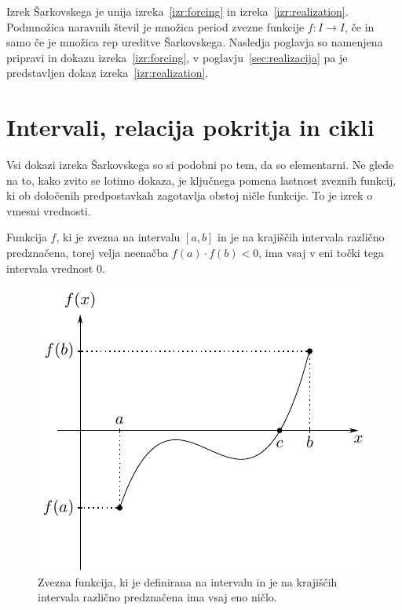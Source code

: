 \documentclass[mat2]{fmfdelo}
\begin{document}
Izrek Šarkovskega je unija izreka~\ref{izr:forcing} in izreka~\ref{izr:realization}. Podmnožica naravnih števil je množica period zvezne funkcije $f:I \to I$, če in samo če je množica rep ureditve Šarkovskega. Nasledja poglavja so namenjena pripravi in dokazu izreka~\ref{izr:forcing}, v poglavju~\ref{sec:realizacija} pa je predstavljen dokaz izreka~\ref{izr:realization}.

\section{Intervali, relacija pokritja in cikli}%
Vsi dokazi izreka Šarkovskega so si podobni po tem, da so elementarni. Ne glede na to, kako zvito se lotimo dokaza, je ključnega pomena lastnost zveznih funkcij, ki ob določenih predpostavkah zagotavlja obstoj ničle funkcije. To je izrek o vmesni vrednosti.

\begin{izrek}\label{izr:iovv}
Funkcija $f$, ki je zvezna na intervalu $[a, b]$ in je na krajiščih intervala različno predznačena, torej velja neenačba $f(a)\cdot f(b) < 0$, ima vsaj v eni točki tega intervala vrednost 0.
\end{izrek}

\begin{figure}[h]
  \centering
  \includegraphics[]{images/intermediate.pdf}
  \caption[Primer vektorske slike.]{Zvezna funkcija, ki je definirana na intervalu in je na krajiščih intervala različno predznačena ima vsaj eno ničlo.}
  \label{fig:bezje}
\end{figure}
\end{document}

